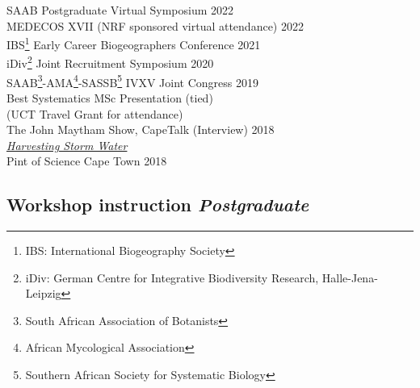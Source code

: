 \documentclass[10pt]{article}
\begin{document}
\begin{multicols}{2}
SAAB Postgraduate Virtual Symposium                      \hfill {\small 2022} \\
MEDECOS XVII {\small (NRF sponsored virtual attendance)} \hfill {\small 2022} \\
IBS\footnote{IBS: International Biogeography Society}
  Early Career Biogeographers Conference                 \hfill {\small 2021} \\
iDiv\footnote{
    iDiv: German Centre for Integrative Biodiversity Research, Halle-Jena-Leipzig}
  Joint Recruitment Symposium                            \hfill {\small 2020} \\
SAAB\footnote{
    South African Association of Botanists}-AMA\footnote{
      African Mycological Association}-SASSB\footnote{
        Southern African Society for Systematic Biology}
  IVXV Joint Congress                                    \hfill {\small 2019} \\
  \hspace{2em} {\small Best Systematics MSc Presentation (tied)}              \\
  \hspace{2em} {\small (UCT Travel Grant for attendance)}                     \\
The John Maytham Show, CapeTalk     {\small (Interview)} \hfill {\small 2018} \\
  \hspace{2em} {\small \href{https://www.capetalk.co.za/articles/328900/harvesting-stormwater-from-liesbeek-river-may-aid-ct-water-supply-students-find}
                            {\textit{Harvesting Storm Water}}}                \\
Pint of Science Cape Town                                \hfill {\small 2018} \\

\columnbreak

\subsection*{Workshop instruction %
                                 \hfill {\small \textmd{\textit{Postgraduate}}}}


\end{multicols}
\end{document}
